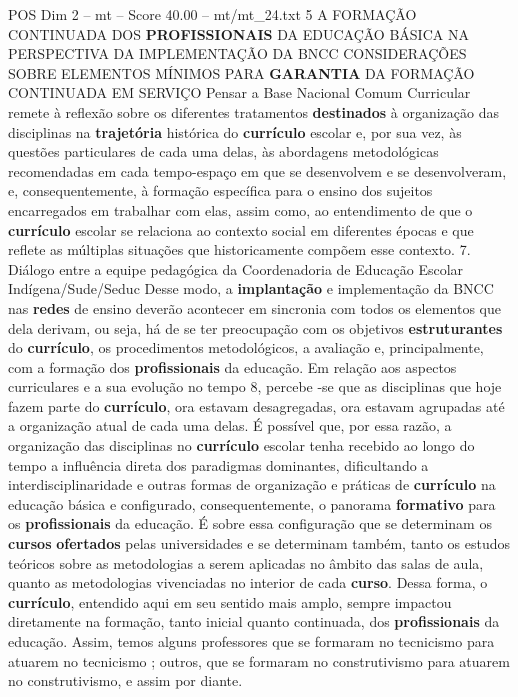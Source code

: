 \begin{textsample}{POS Dim 2 – mt – Score 40.00 – mt/mt\_24.txt}  \label{ex:f2_pos_221}
5 A FORMAÇÃO CONTINUADA DOS \textbf{PROFISSIONAIS} DA EDUCAÇÃO BÁSICA NA PERSPECTIVA DA IMPLEMENTAÇÃO DA BNCC CONSIDERAÇÕES SOBRE ELEMENTOS MÍNIMOS PARA \textbf{GARANTIA} DA FORMAÇÃO CONTINUADA EM SERVIÇO Pensar a Base Nacional Comum Curricular remete à reflexão sobre os diferentes tratamentos \textbf{destinados} à organização das disciplinas na \textbf{trajetória} histórica do \textbf{currículo} escolar e, por sua vez, às questões particulares de cada uma delas, às abordagens metodológicas recomendadas em cada tempo-espaço em que se desenvolvem e se desenvolveram, e, consequentemente, à formação específica para o ensino dos sujeitos encarregados em trabalhar com elas, assim como, ao entendimento de que o \textbf{currículo} escolar se relaciona ao contexto social em diferentes épocas e que reflete as múltiplas situações que historicamente compõem esse contexto. 7.
Diálogo entre a equipe pedagógica da Coordenadoria de Educação Escolar Indígena/Sude/Seduc Desse modo, a \textbf{implantação} e implementação da BNCC nas \textbf{redes} de ensino deverão acontecer em sincronia com todos os elementos que dela derivam, ou seja, há de se ter preocupação com os objetivos \textbf{estruturantes} do \textbf{currículo}, os procedimentos metodológicos, a avaliação e, principalmente, com a formação dos \textbf{profissionais} da educação.
Em relação aos aspectos curriculares e a sua evolução no tempo 8, percebe -se que as disciplinas que hoje fazem parte do \textbf{currículo}, ora estavam desagregadas, ora estavam agrupadas até a organização atual de cada uma delas.
É possível que, por essa razão, a organização das disciplinas no \textbf{currículo} escolar tenha recebido ao longo do tempo a influência direta dos paradigmas dominantes, dificultando a interdisciplinaridade e outras formas de organização e práticas de \textbf{currículo} na educação básica e configurado, consequentemente, o panorama \textbf{formativo} para os \textbf{profissionais} da educação.
É sobre essa configuração que se determinam os \textbf{cursos} \textbf{ofertados} pelas universidades e se determinam também, tanto os estudos teóricos sobre as metodologias a serem aplicadas no âmbito das salas de aula, quanto as metodologias vivenciadas no interior de cada \textbf{curso}.
Dessa forma, o \textbf{currículo}, entendido aqui em seu sentido mais amplo, sempre impactou diretamente na formação, tanto inicial quanto continuada, dos \textbf{profissionais} da educação.
Assim, temos alguns professores que se formaram no tecnicismo para atuarem no tecnicismo ; outros, que se formaram no construtivismo para atuarem no construtivismo, e assim por diante.

\end{textsample}
